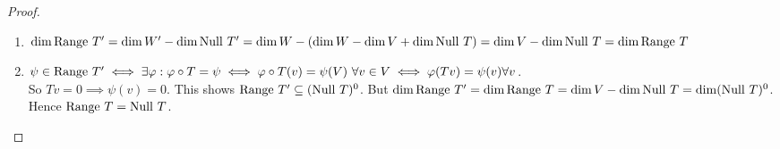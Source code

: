 \begin{proof} $ $
    \begin{enumerate}[label = (\alph*)]
        \item $\dim \text{Range } T' = \dim W' - \dim \text{Null } T' = \dim W - (\dim W - \dim V + \dim \text{Null } T) = \dim V - \dim \text{Null } T = \dim \text{Range } T$
        \item $\psi \in \range T' \iff \exists \varphi : \varphi \circ T = \psi \iff \varphi \circ T(v) = \psi(V) \ \forall v \in V \iff \varphi(Tv) = \psi(v) \forall v$. \\ So $Tv = 0 \implies \psi(v) = 0$. This shows $\text{Range } T' \subseteq (\text{Null } T)^0$. But $\dim \text{Range } T' = \dim \text{Range } T = \dim V - \dim \text{Null } T = \dim (\text{Null } T)^0$. Hence $\text{Range } T = \text{Null } T$.
    \end{enumerate}
\end{proof}